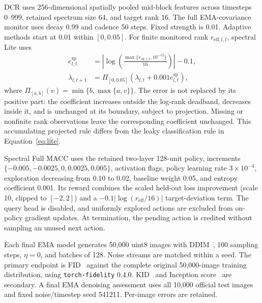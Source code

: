 \documentclass[10pt,a4paper,twocolumn]{article}
\begin{document}
DCR uses 256-dimensional spatially pooled mid-block features
across timesteps 0--999, retained spectrum size 64,
and target rank 16.
The full EMA-covariance monitor uses decay 0.99 and cadence
50 steps. Fixed strength is 0.01.
Adaptive methods start at 0.01 within $[0,0.05]$.
For finite monitored rank $r_{\mathrm{eff},l,t}$, spectral Lite uses
\begin{align}
 e^{\mathrm{sp}}_{l,t}
 &=\left|\log\!\left(
 \frac{\max\{r_{\mathrm{eff},l,t},10^{-12}\}}{16}
 \right)\right|-0.1,\nonumber\\
 \lambda_{l,t+1}
 &=\Pi_{[0,0.05]}\!\left(\lambda_{l,t}
                +0.001e^{\mathrm{sp}}_{l,t}\right),
 \label{eq:spectral_lite_update}
\end{align}
where $\Pi_{[a,b]}(v)=\min\{b,\max\{a,v\}\}$.
The error is not replaced by its positive part: the coefficient
increases outside the log-rank deadband, decreases inside it, and
is unchanged at its boundary, subject to projection. Missing or
nonfinite rank observations leave the corresponding coefficient
unchanged. This accumulating projected rule differs from the leaky
classification rule in Equation~\eqref{eq:lite}.

Spectral Full MACC uses the retained two-layer 128-unit policy,
increments $\{-0.005,-0.0025,0,0.0025,0.005\}$,
activation flags, policy learning rate $3\times10^{-4}$,
exploration decreasing from 0.10 to 0.02, baseline weight 0.05,
and entropy coefficient 0.001.
Its reward combines the scaled held-out loss improvement
(scale 10, clipped to $[-2,2]$) and a
$-0.1|\log(r_{\mathrm{eff}}/16)|$ target-deviation term.
The query head is disabled, and uniformly explored actions
are excluded from on-policy gradient updates.
At termination, the pending action is credited without sampling
an unused next action.

Each final EMA model generates 50,000 uint8 images with
DDIM~\cite{song2021ddim}, 100 sampling steps, $\eta=0$,
and batches of 128. Noise streams are matched within a seed.
The primary endpoint is FID~\cite{heusel2017fid} against the
complete original 50,000-image training distribution, using
\texttt{torch-fidelity} 0.4.0.
KID~\cite{binkowski2018mmd} and Inception
score~\cite{salimans2016gan} are secondary.
A final EMA denoising assessment uses all 10,000 official test
images and fixed noise/timestep seed 541211.
Per-image errors are retained.
\end{document}
